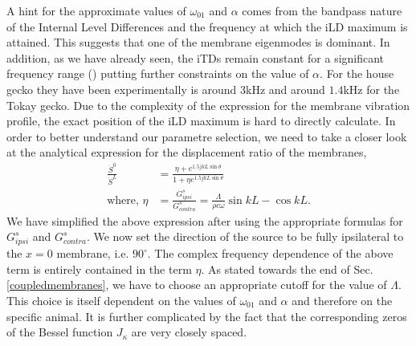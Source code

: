A hint for the approximate values of $\omega_{01}$
and $\alpha$ comes from the bandpass nature of the Internal Level Differences and the frequency at which the iLD maximum is attained.
This suggests that one of the membrane eigenmodes is dominant. In addition, as we have already seen, the iTDs remain constant for a significant frequency
range (\cite[p~.1996]{dalsgaardtangcarr}) putting further constraints on the value of $\alpha$. For the house gecko they have been experimentally is around $3$kHz and
 around $1.4$kHz for the Tokay gecko. Due to the complexity of the expression for the membrane vibration profile, the exact position of the iLD maximum is hard to directly calculate.
In order to better understand our parametre selection, we 
need to take a closer look at the analytical expression for the displacement ratio of the membranes,
\begin{align}
 \frac{\dot{S}^0}{\dot{S}^L}&=\frac{\eta+e^{1.5jkL\sin\theta}}{1+\eta e^{1.5jkL\sin\theta}}\\
 \mbox{where, }\eta&=\frac{G^s_{ipsi}}{G^s_{contra}}=\frac{\Lambda}{\rho c\omega}\sin kL-\cos kL.\nonumber
\end{align}
We have simplified the above expression after using the appropriate formulas for $G^s_{ipsi}$ and $G^s_{contra}$. We now 
set the direction of the source to be fully ipsilateral to the $x=0$ membrane, i.e. $90^\circ$. The complex frequency
dependence of the above term is entirely contained in the term $\eta$. As stated towards the end
of Sec. \ref{coupledmembranes}, we have to choose an appropriate cutoff for the value of $\Lambda$. This choice is itself
dependent on the values of $\omega_{01}$ and $\alpha$ and therefore on the specific animal. It is further complicated by
the fact that the corresponding zeros of the Bessel function $J_\kappa$ are very closely spaced. 

